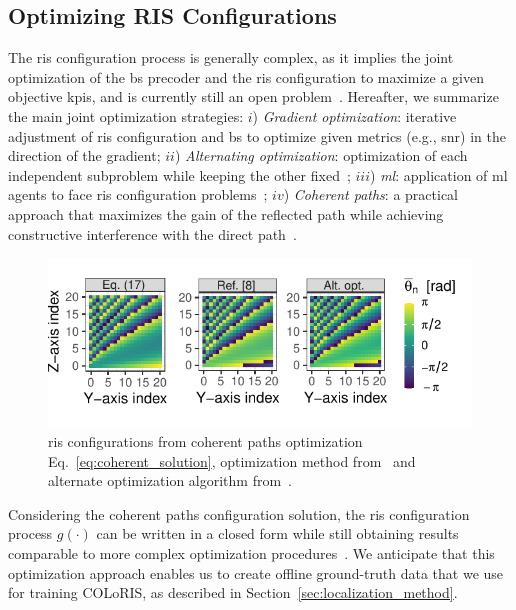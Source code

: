 \documentclass[10pt,journal,compsoc]{IEEEtran}
\newcommand{\name}{COLoRIS}
\begin{document}
\subsection{Optimizing RIS Configurations}
\label{sec:configuration_methods}

The \gls{ris} configuration process is generally complex, as it implies the joint optimization of the \gls{bs} precoder and the \gls{ris} configuration to maximize a given objective \glspl{kpi}, and is currently still an open problem~\cite{pan2022overview}. Hereafter, we summarize the main joint optimization strategies: $i$) \emph{Gradient optimization}: iterative adjustment of \gls{ris} configuration and \gls{bs} to optimize given metrics (e.g., \gls{snr}) in the direction of the gradient; $ii$) \emph{Alternating optimization}: optimization of each independent subproblem while keeping the other fixed~\cite{mursia2020risma,yu2020robust}; $iii$) \emph{\acrlong{ml}}: application of \gls{ml} agents to face \gls{ris} configuration problems~\cite{faisal2022machine,encinas2023unlocking}; $iv$) \emph{Coherent paths}: a practical approach that maximizes the gain of the reflected path while achieving constructive interference with the direct path~\cite{bjornson2019intelligent}.


\begin{figure}[t]
\centering

\includegraphics[width=1\linewidth, trim = {0cm 0.75cm 0cm 0cm}]{Figures/fig02.pdf}

\caption{\gls{ris} configurations from coherent paths optimization Eq.~\eqref{eq:coherent_solution}, optimization method from~\cite{bjornson2019intelligent} and alternate optimization algorithm from~\cite{mursia2020risma}.} \label{fig:coherent_vs_risma}
\end{figure}




Considering the coherent paths configuration solution, the \gls{ris} configuration process $g(\cdot)$ can be written in a closed form while still obtaining results comparable to more complex optimization procedures~\cite{albanese2022marisa}.
We anticipate that this optimization approach enables us to create offline ground-truth data that we use for training \name{}, as described in Section~\ref{sec:localization_method}.
\end{document}
